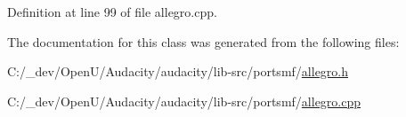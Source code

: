 Definition at line 99 of file allegro.\+cpp.



The documentation for this class was generated from the following files\+:\begin{DoxyCompactItemize}
\item 
C\+:/\+\_\+dev/\+Open\+U/\+Audacity/audacity/lib-\/src/portsmf/\hyperlink{allegro_8h}{allegro.\+h}\item 
C\+:/\+\_\+dev/\+Open\+U/\+Audacity/audacity/lib-\/src/portsmf/\hyperlink{allegro_8cpp}{allegro.\+cpp}\end{DoxyCompactItemize}
